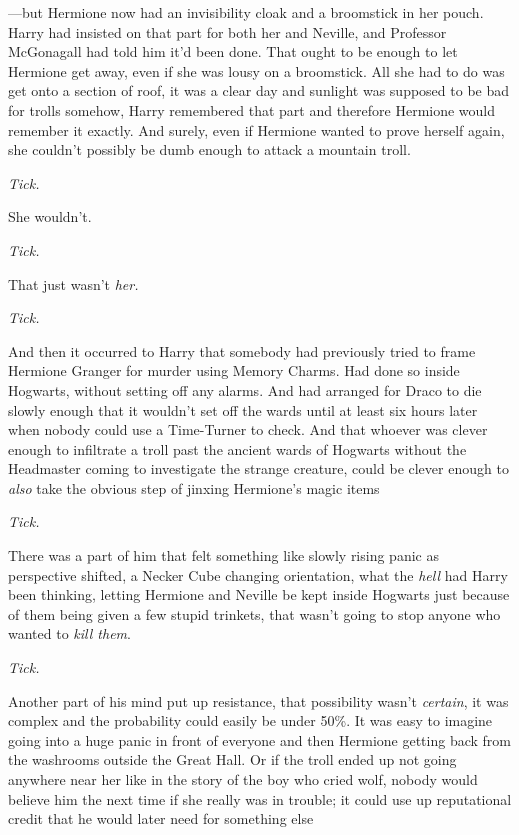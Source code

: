 —but Hermione now had an invisibility cloak and a broomstick in her pouch.
Harry had insisted on that part for both her and Neville, and Professor
McGonagall had told him it'd been done. That ought to be enough to let Hermione
get away, even if she was lousy on a broomstick. All she had to do was get onto
a section of roof, it was a clear day and sunlight was supposed to be bad for
trolls somehow, Harry remembered that part and therefore Hermione would
remember it exactly. And surely, even if Hermione wanted to prove herself
again, she couldn't possibly be dumb enough to attack a mountain troll.

\emph{Tick.}

She wouldn't.

\emph{Tick.}

That just wasn't \emph{her.}

\emph{Tick.}

And then it occurred to Harry that somebody had previously tried to frame
Hermione Granger for murder using Memory Charms. Had done so inside Hogwarts,
without setting off any alarms. And had arranged for Draco to die slowly enough
that it wouldn't set off the wards until at least six hours later when nobody
could use a Time-Turner to check. And that whoever was clever enough to
infiltrate a troll past the ancient wards of Hogwarts without the Headmaster
coming to investigate the strange creature, could be clever enough to
\emph{also} take the obvious step of jinxing Hermione's magic items{\el}

\emph{Tick.}

There was a part of him that felt something like slowly rising panic as
perspective shifted, a Necker Cube changing orientation, what the \emph{hell}
had Harry been thinking, letting Hermione and Neville be kept inside Hogwarts
just because of them being given a few stupid trinkets, that wasn't going to
stop anyone who wanted to \emph{kill them}.

\emph{Tick.}

Another part of his mind put up resistance, that possibility wasn't
\emph{certain}, it was complex and the probability could easily be under 50\%.
It was easy to imagine going into a huge panic in front of everyone and then
Hermione getting back from the washrooms outside the Great Hall. Or if the
troll ended up not going anywhere near her{\el} like in the story of the boy
who cried wolf, nobody would believe him the next time if she really was in
trouble; it could use up reputational credit that he would later need for
something else{\el}

